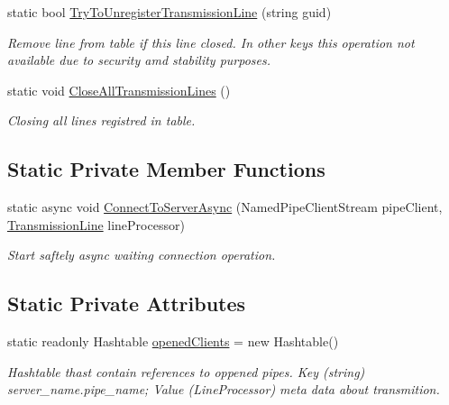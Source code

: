 \begin{DoxyCompactItemize}
static bool \mbox{\hyperlink{class_pipes_provider_1_1_client_1_1_client_a_p_i_a20139222de5ce13aa336e7c4db174f91}{Try\+To\+Unregister\+Transmission\+Line}} (string guid)
\begin{DoxyCompactList}\small\item\em Remove line from table if this line closed. In other keys this operation not available due to security amd stability purposes. \end{DoxyCompactList}\item 
static void \mbox{\hyperlink{class_pipes_provider_1_1_client_1_1_client_a_p_i_a4c588f18a7e7ff618702a27681543889}{Close\+All\+Transmission\+Lines}} ()
\begin{DoxyCompactList}\small\item\em Closing all lines registred in table. \end{DoxyCompactList}\end{DoxyCompactItemize}
\subsection*{Static Private Member Functions}
\begin{DoxyCompactItemize}
\item 
static async void \mbox{\hyperlink{class_pipes_provider_1_1_client_1_1_client_a_p_i_a4c62796db87af40dc4c6b8eb578c6487}{Connect\+To\+Server\+Async}} (Named\+Pipe\+Client\+Stream pipe\+Client, \mbox{\hyperlink{class_pipes_provider_1_1_client_1_1_transmission_line}{Transmission\+Line}} line\+Processor)
\begin{DoxyCompactList}\small\item\em Start saftely async waiting connection operation. \end{DoxyCompactList}\end{DoxyCompactItemize}
\subsection*{Static Private Attributes}
\begin{DoxyCompactItemize}
\item 
static readonly Hashtable \mbox{\hyperlink{class_pipes_provider_1_1_client_1_1_client_a_p_i_aafef8e556d18d889412c1f48451250c4}{opened\+Clients}} = new Hashtable()
\begin{DoxyCompactList}\small\item\em Hashtable thast contain references to oppened pipes. Key (string) server\+\_\+name.\+pipe\+\_\+name; Value (Line\+Processor) meta data about transmition. \end{DoxyCompactList}\end{DoxyCompactItemize}


